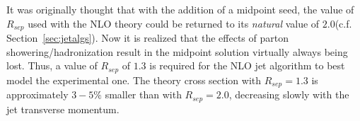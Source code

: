 \documentclass[12pt]{iopart}
\begin{document}
%
%
It was originally thought that with the addition of a midpoint seed, the value of $R_{sep}$ used with the NLO theory
could be returned to its {\it natural} value of $2.0$(c.f. Section~\ref{sec:jetalgs}). Now it is realized that the effects of parton
showering/hadronization result in the midpoint solution virtually always being lost. Thus, a value of $R_{sep}$ of
$1.3$ is required  for the NLO jet algorithm to best model the experimental one. The theory cross section with
$R_{sep}=1.3$ is approximately $3-5\%$ smaller than with $R_{sep}=2.0$, decreasing slowly with the jet transverse
momentum.

\setcounter{footnote}{0}

\end{document}
